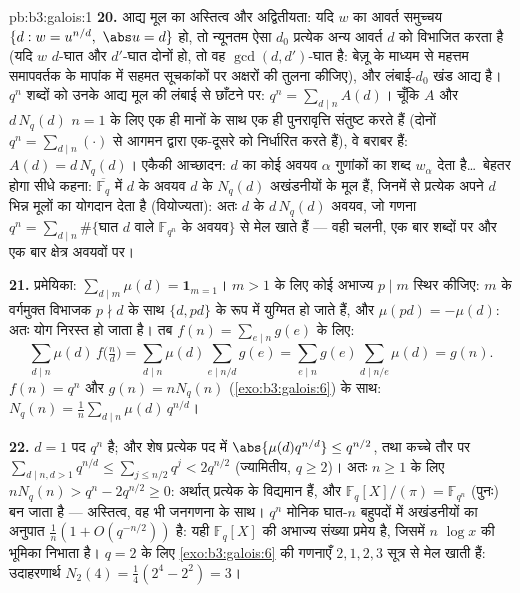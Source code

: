 \begin{solution}{pb:b3:galois:1}
\textbf{20.} आद्य मूल का अस्तित्व और अद्वितीयता: यदि $w$ का आवर्त
समुच्चय $\{d : w = u^{n/d},\ \abs u = d\}$ हो, तो न्यूनतम ऐसा $d_0$ प्रत्येक अन्य आवर्त $d$
को विभाजित करता है (यदि $w$ $d$-घात और $d'$-घात दोनों हो, तो
वह $\gcd(d, d')$-घात है: बेज़ू के माध्यम से महत्तम समापवर्तक के मापांक में
सहमत सूचकांकों पर अक्षरों की तुलना कीजिए), और लंबाई-$d_0$ खंड आद्य
है। $q^n$ शब्दों को उनके आद्य मूल की लंबाई से छाँटने पर: $q^n = \sum_{d \mid n}A(d)$।
चूँकि $A$ और $d\,N_q(d)$ $n = 1$ के लिए एक ही मानों के साथ एक ही पुनरावृत्ति
संतुष्ट करते हैं (दोनों $q^n
= \sum_{d\mid n}(\cdot)$ से आगमन द्वारा एक-दूसरे को निर्धारित
करते हैं), वे बराबर हैं: $A(d) =
d\,N_q(d)$। एकैकी आच्छादन:  $d$ का कोई
अवयव $\alpha$ गुणांकों का शब्द $w_\alpha$ देता है\dots\ बेहतर होगा सीधे
कहना: $\overline{\mathbb F_q}$ में  $d$ के अवयव  $d$ के $N_q(d)$ अखंडनीयों के
मूल हैं, जिनमें से प्रत्येक अपने $d$ भिन्न मूलों का योगदान देता
है (वियोज्यता): अतः  $d$ के $d\,N_q(d)$ अवयव, जो गणना $q^n = \sum_{d\mid n}\#\{
\text{घात } d \text{ वाले } \mathbb F_{q^n} \text{ के अवयव}\}$ से मेल
खाते हैं --- वही चलनी, एक बार शब्दों पर और एक बार क्षेत्र अवयवों
पर।

\textbf{21.} प्रमेयिका: $\sum_{d \mid m}\mu(d) = \mathbf
1_{m=1}$। $m > 1$ के लिए कोई अभाज्य $p \mid m$ स्थिर
कीजिए: $m$ के वर्गमुक्त विभाजक $p \nmid d$ के साथ $\{d, pd\}$ के रूप में
युग्मित हो जाते हैं, और $\mu(pd) = -\mu(d)$: अतः योग निरस्त हो जाता है। तब $f(n) =
\sum_{e\mid n}g(e)$
के लिए:
\[
\sum_{d \mid n}\mu(d)\,f\bigl(\tfrac nd\bigr)
= \sum_{d \mid n}\mu(d)\!\!\sum_{e \mid n/d}\!\!g(e)
= \sum_{e \mid n}g(e)\!\!\sum_{d \mid n/e}\!\!\mu(d)
= g(n) .
\]
$f(n) = q^n$ और $g(n) = nN_q(n)$ (\cref{exo:b3:galois:6}) के साथ: $N_q(n) =
\frac1n\sum_{d\mid n}\mu(d)\,q^{n/d}$।

\textbf{22.} $d = 1$ पद $q^n$ है; और शेष प्रत्येक पद में $\abs{\mu(d)q^{n/d}} \leq q^{n/2}$, तथा
कच्चे तौर पर $\sum_{d \mid n, d > 1}q^{n/d} \leq \sum_{j \leq
n/2}q^j < 2q^{n/2}$ (ज्यामितीय, $q \geq 2$)। अतः $n \geq 1$ के लिए $nN_q(n) >
q^n - 2q^{n/2} \geq 0$:
अर्थात् प्रत्येक  के  विद्यमान हैं, और $\mathbb F_q[X]/(\pi) = \mathbb F_{q^n}$ (पुनः) बन
जाता है --- अस्तित्व, वह भी जनगणना के साथ। $q^n$ मोनिक घात-$n$
बहुपदों में अखंडनीयों का अनुपात $\frac1n(1 + O(q^{-n/2}))$ है: यही $\mathbb F_q[X]$ की अभाज्य संख्या
प्रमेय है, जिसमें $n$ $\log x$ की भूमिका निभाता है। $q = 2$ के लिए
\cref{exo:b3:galois:6} की गणनाएँ $2, 1, 2, 3$ सूत्र से मेल खाती हैं: उदाहरणार्थ $N_2(4) = \frac14(2^4 - 2^2) = 3$।


\end{solution}
